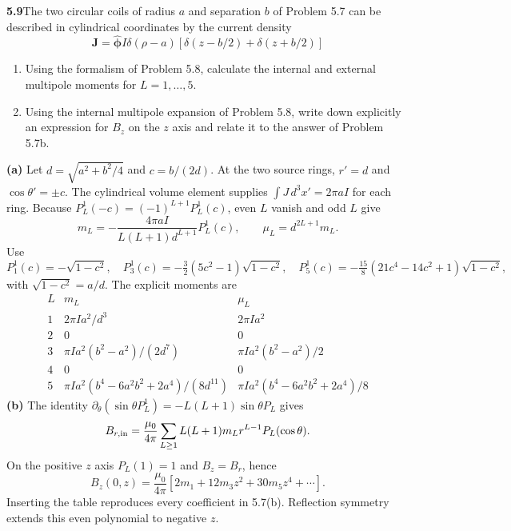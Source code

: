 \par\bigskip
\noindent\textbf{5.9}\quad The two circular coils of radius $a$ and separation $b$ of Problem 5.7 can be described in cylindrical coordinates by the current density
\[
\mathbf{J}=\hat{\boldsymbol{\phi}}I\delta(\rho-a)[\delta(z-b/2)+\delta(z+b/2)]
\]
\begin{enumerate}
\item[(a)] Using the formalism of Problem 5.8, calculate the internal and external multipole moments for $L=1,\ldots,5$.
\item[(b)] Using the internal multipole expansion of Problem 5.8, write down explicitly an expression for $B_{z}$ on the $z$ axis and relate it to the answer of Problem 5.7b.
\end{enumerate}
\solution
\textbf{(a)} Let $d=\sqrt{a^2+b^2/4}$ and $c=b/(2d)$.
At the two source rings, $r'=d$ and $\cos\theta'=\pm c$.
The cylindrical volume element supplies
$\int J\,d^3x'=2\pi aI$ for each ring.
Because $P_L^1(-c)=(-1)^{L+1}P_L^1(c)$, even $L$ vanish and odd $L$ give
\[
m_L=-\frac{4\pi aI}{L(L+1)d^{L+1}}P_L^1(c),\qquad
\mu_L=d^{2L+1}m_L.
\]
Use
\[
P_1^1(c)=-\sqrt{1-c^2},\quad
P_3^1(c)=-\tfrac32(5c^2-1)\sqrt{1-c^2},\quad
P_5^1(c)=-\tfrac{15}{8}(21c^4-14c^2+1)\sqrt{1-c^2},
\]
with $\sqrt{1-c^2}=a/d$. The explicit moments are
\[
\begin{array}{c|c|c}
L&m_L&\mu_L\\\hline
1&2\pi Ia^2/d^3&2\pi Ia^2\\[2pt]
2&0&0\\[2pt]
3&\pi Ia^2(b^2-a^2)/(2d^7)&\pi Ia^2(b^2-a^2)/2\\[2pt]
4&0&0\\[2pt]
5&\pi Ia^2(b^4-6a^2b^2+2a^4)/(8d^{11})
&\pi Ia^2(b^4-6a^2b^2+2a^4)/8
\end{array}
\]
\textbf{(b)} The identity $\partial_\theta(\sin\theta P_L^1)
=-L(L+1)\sin\theta P_L$ gives
\[
B_{r,\rm in}=\frac{\mu_0}{4\pi}
\sum_{L\ge1}L(L+1)m_Lr^{L-1}P_L(\cos\theta).
\]
On the positive $z$ axis $P_L(1)=1$ and $B_z=B_r$, hence
\[
B_z(0,z)=\frac{\mu_0}{4\pi}
[2m_1+12m_3z^2+30m_5z^4+\cdots].
\]
Inserting the table reproduces every coefficient in 5.7(b).
Reflection symmetry extends this even polynomial to negative $z$.


